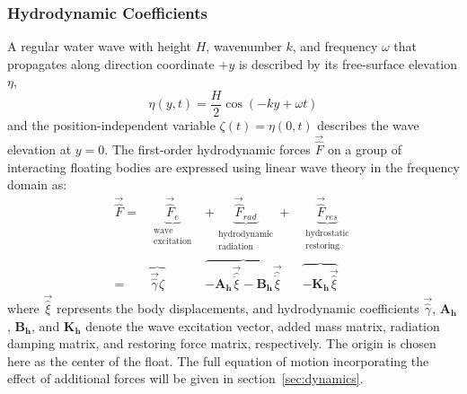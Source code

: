 \subsubsection{Hydrodynamic Coefficients}\label{sec:meem}
A regular water wave with height $H$, wavenumber $k$, and frequency $\omega$ that propagates along direction coordinate $+y$ is described by its free-surface elevation $\eta$,
\begin{equation}
    \eta(y,t)=\frac{H}{2}\cos(-ky+\omega t)
\end{equation}
and the position-independent variable $\zeta(t)=\eta(0,t)$ describes the wave elevation at $y=0$.
The first-order hydrodynamic forces $\vec{\hat{F}}$ on a group of interacting floating bodies are expressed using linear wave theory in the frequency domain as:
\setlength\arraycolsep{0pt}
\begin{equation}\label{eq:hydro-forces}
\begin{array}{rCCCCC}
     \vec{\hat{F}} = & \underbrace{\vec{\hat{F}}_{e}}_{\substack{\textrm{wave} \\  \textrm{excitation} }} & +\underbrace{\vec{\hat{F}}_{rad}}_{\substack{\text{hydrodynamic} \\ \text{radiation} }} +&  \underbrace{ \vec{\hat{F}}_{res}}_{\substack{\textrm{hydrostatic} \\ \text{restoring} }} \\
    = & \overbrace{\vec{\hat{\gamma}} \hat{\zeta}} & \overbrace{-\mathbf{A_h}\vec{\hat{\ddot{\xi}}} - \mathbf{B_h}\vec{\hat{\dot{\xi}}}} &  \overbrace{-\mathbf{K_h}\vec{\hat{\xi}}}
\end{array}
\end{equation}
where $\vec{\hat{\xi}}$ represents the body displacements, and hydrodynamic coefficients $\vec{\hat{\gamma}}$, $\mathbf{A_h}$, $\mathbf{B_h}$, and $\mathbf{K_h}$ denote the wave excitation vector, added mass matrix, radiation damping matrix, and restoring force matrix, respectively.
The origin is chosen here as the center of the float.
The full equation of motion incorporating the effect of additional forces will be given in section~\ref{sec:dynamics}.

